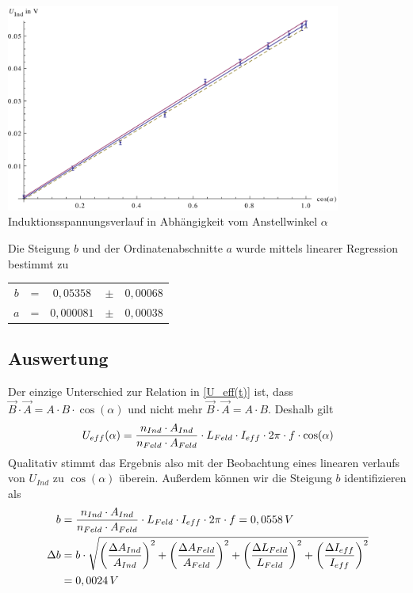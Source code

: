 \documentclass{article}
\begin{document}
\begin{center}
  \includegraphics[width=11cm]{graphen/graph4}
	Induktionsspannungsverlauf in Abhängigkeit vom Anstellwinkel \( \alpha \)
\end{center}
Die Steigung \(b\) und der Ordinatenabschnitte \(a\) wurde mittels linearer Regression bestimmt zu

\begin{center}
\begin{tabular}{c c c c c} 
  \(b\) & = & \(0,05358\) & \(\pm \) & \(0,00068 \) \\ 
  \(a\) & = & \(0,000081\) & \(\pm \) & \(0,00038 \) \\ 

 \end{tabular}
\end{center}

\subsection{Auswertung}
Der einzige Unterschied zur Relation in \eqref{U_eff(t)} ist, dass \(\vec{B} \cdot \vec{A} = A \cdot B \cdot \cos(\alpha) \) und nicht mehr \(\vec{B} \cdot \vec{A} = A \cdot B \). Deshalb gilt
\begin{equation}
U_{eff}(\alpha) = \frac{n_{Ind} \cdot A_{Ind}}{n_{Feld} \cdot A_{Feld}} \cdot L_{Feld} \cdot I_{eff} \cdot 2\pi \cdot f \cdot \cos(\alpha)
\notag
\end{equation}
Qualitativ stimmt das Ergebnis also mit der Beobachtung eines linearen verlaufs von \( U_{Ind} \) zu \( \cos(\alpha) \) überein. Außerdem können wir die Steigung \(b\) identifizieren als
\begin{align}
b &= \frac{n_{Ind} \cdot A_{Ind}}{n_{Feld} \cdot A_{Feld}} \cdot L_{Feld} \cdot I_{eff} \cdot 2\pi \cdot f
= 0,0558 \,V
\notag
\\
\Delta b &= b \cdot \sqrt{
\left( \frac{\Delta A_{Ind}}{A_{Ind}} \right)^2 +
\left( \frac{\Delta A_{Feld}}{A_{Feld}} \right)^2 +
\left( \frac{\Delta L_{Feld}}{L_{Feld}} \right)^2 +
\left( \frac{\Delta I_{eff}}{I_{eff}} \right)^2
}
\notag
\\
&= 0,0024 \, V
\notag
\end{align}
\end{document}
